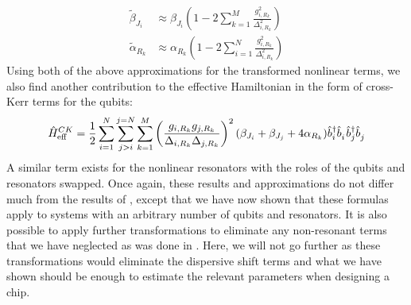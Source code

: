 \begin{align}
    \tilde{\beta}_{J_i} &\approx \beta_{J_i}\left( 1 - 2\sum_{k=1}^{M} \frac{g_{i,R_k}^2}{\Delta_{i,R_k}^2} \right) \\
    \tilde{\alpha}_{R_k} &\approx \alpha_{R_k}\left( 1 - 2\sum_{i=1}^N \frac{g_{i,R_k}^2}{\Delta_{i,R_k}^2} \right)
\end{align}
Using both of the above approximations for the transformed nonlinear terms, we also find another contribution to the effective Hamiltonian in the form of cross-Kerr terms for the qubits:
\begin{equation}
    \hat{H}_{\text{eff}}^{CK} = \frac{1}{2}\sum_{i=1}^{N}\sum_{j > i}^{j=N}\sum_{k=1}^M \left( \frac{g_{i,R_k}g_{j,R_k}}{\Delta_{i,R_k}\Delta_{j,R_k}} \right)^2 (\beta_{J_i} + \beta_{J_j} + 4\alpha_{R_k}) \opbd_i\opb_i\opbd_j\opb_j
\end{equation}
A similar term exists for the nonlinear resonators with the roles of the qubits and resonators swapped. Once again, these results and approximations do not differ much from the results of \cite{tunable_coupler_ext}, except that we have now shown that these formulas apply to systems with an arbitrary number of qubits and resonators. It is also possible to apply further transformations to eliminate any non-resonant terms that we have neglected as was done in \cite{tunable_coupler_ext}. Here, we will not go further as these transformations would eliminate the dispersive shift terms and what we have shown should be enough to estimate the relevant parameters when designing a chip.
